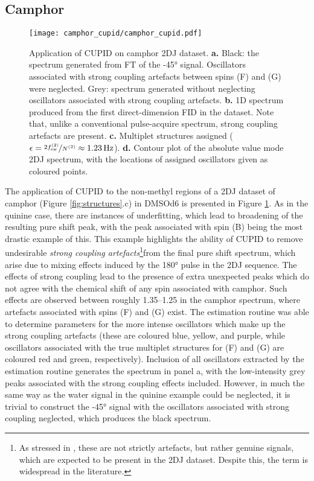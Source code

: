 \subsection{Camphor}
\begin{figure}%
    \centering%
    \texttt{[image: camphor\_cupid/camphor\_cupid.pdf]}%
    \caption[
        Application of \acs{CUPID} on a camphor dataset.
    ]{
        Application of \acs{CUPID} on camphor \ac{2DJ} dataset.
        \textbf{a.} Black: the spectrum generated from \ac{FT} of the \ang{-45}
        signal. Oscillators associated with strong coupling artefacts between
        spins (F) and (G) were neglected. Grey: spectrum generated without
        neglecting oscillators associated with strong coupling artefacts.
        \textbf{b.} \acs{1D} spectrum produced from the first direct-dimension
        \ac{FID} in the dataset. Note that, unlike a conventional pulse-acquire
        spectrum, strong coupling artefacts are present.
        \textbf{c.} Multiplet structures assigned ($\epsilon =
        \nicefrac{2 f_{\mathrm{sw}}^{(2)}}{N^{(2)}} \approx \qty{1.23}{\hertz}$).
        \textbf{d.} Contour plot of the absolute value mode \acs{2DJ} spectrum,
        with the locations of assigned oscillators given as coloured points.
    }
    \label{fig:camphor-cupid}%
\end{figure}%
The application of \ac{CUPID} to the non-methyl regions of a \ac{2DJ}
dataset of camphor (Figure \ref{fig:structures}.c) in \acs{DMSOd6} is presented
in Figure \ref{fig:camphor-cupid}. As in the quinine case, there are instances
of underfitting, which lead to broadening of the resulting pure shift peak,
with the peak associated with spin (B) being the most drastic example of this.
This example highlights the ability of \ac{CUPID} to remove undesirable
\emph{strong coupling artefacts}\footnote{
    As stressed in \cite{Thrippleton2005}, these are not strictly artefacts,
    but rather genuine signals, which are expected to be present in the
    \ac{2DJ} dataset. Despite this, the term is widespread in the literature.
}from the final pure shift spectrum, which
arise due to mixing effects induced by the \ang{180} pulse in the \ac{2DJ}
sequence\cite{Thrippleton2005,Wider1983}.
The effects of strong coupling lead to the presence of extra unexpected peaks
which do not agree with the chemical shift of any spin associated with camphor.
Such effects are observed between roughly \SIrange{1.35}{1.25}{\partspermillion} in
the camphor spectrum, where artefacts associated with spins (F) and (G) exist.
The estimation routine was able to determine parameters for
the more intense oscillators which make up the strong coupling artefacts (these
are coloured blue, yellow, and purple, while oscillators associated with the
true multiplet structures for (F) and (G) are coloured red and green, respectively).
Inclusion of all oscillators extracted by the estimation routine generates the
spectrum in panel a, with the low-intensity grey peaks associated with the strong
coupling effects included. However, in much the same way as the water signal in
the quinine example could be neglected, it is trivial to construct the \ang{-45}
signal with the oscillators associated with strong coupling neglected, which
produces the black spectrum.

